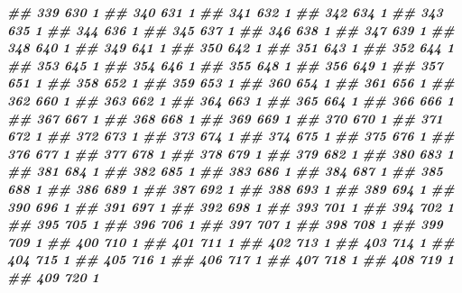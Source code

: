 \documentclass[
]{book}
\newenvironment{Shaded}{\begin{snugshade}}{\end{snugshade}}
\newcommand{\DocumentationTok}[1]{\textcolor[rgb]{0.56,0.35,0.01}{\textbf{\textit{#1}}}}
\theoremstyle{definition}
\theoremstyle{definition}
\theoremstyle{definition}
\theoremstyle{definition}
\theoremstyle{remark}
\begin{document}
\begin{Shaded}
\begin{Highlighting}[]
\DocumentationTok{\#\# 339    630 1}
\DocumentationTok{\#\# 340    631 1}
\DocumentationTok{\#\# 341    632 1}
\DocumentationTok{\#\# 342    634 1}
\DocumentationTok{\#\# 343    635 1}
\DocumentationTok{\#\# 344    636 1}
\DocumentationTok{\#\# 345    637 1}
\DocumentationTok{\#\# 346    638 1}
\DocumentationTok{\#\# 347    639 1}
\DocumentationTok{\#\# 348    640 1}
\DocumentationTok{\#\# 349    641 1}
\DocumentationTok{\#\# 350    642 1}
\DocumentationTok{\#\# 351    643 1}
\DocumentationTok{\#\# 352    644 1}
\DocumentationTok{\#\# 353    645 1}
\DocumentationTok{\#\# 354    646 1}
\DocumentationTok{\#\# 355    648 1}
\DocumentationTok{\#\# 356    649 1}
\DocumentationTok{\#\# 357    651 1}
\DocumentationTok{\#\# 358    652 1}
\DocumentationTok{\#\# 359    653 1}
\DocumentationTok{\#\# 360    654 1}
\DocumentationTok{\#\# 361    656 1}
\DocumentationTok{\#\# 362    660 1}
\DocumentationTok{\#\# 363    662 1}
\DocumentationTok{\#\# 364    663 1}
\DocumentationTok{\#\# 365    664 1}
\DocumentationTok{\#\# 366    666 1}
\DocumentationTok{\#\# 367    667 1}
\DocumentationTok{\#\# 368    668 1}
\DocumentationTok{\#\# 369    669 1}
\DocumentationTok{\#\# 370    670 1}
\DocumentationTok{\#\# 371    672 1}
\DocumentationTok{\#\# 372    673 1}
\DocumentationTok{\#\# 373    674 1}
\DocumentationTok{\#\# 374    675 1}
\DocumentationTok{\#\# 375    676 1}
\DocumentationTok{\#\# 376    677 1}
\DocumentationTok{\#\# 377    678 1}
\DocumentationTok{\#\# 378    679 1}
\DocumentationTok{\#\# 379    682 1}
\DocumentationTok{\#\# 380    683 1}
\DocumentationTok{\#\# 381    684 1}
\DocumentationTok{\#\# 382    685 1}
\DocumentationTok{\#\# 383    686 1}
\DocumentationTok{\#\# 384    687 1}
\DocumentationTok{\#\# 385    688 1}
\DocumentationTok{\#\# 386    689 1}
\DocumentationTok{\#\# 387    692 1}
\DocumentationTok{\#\# 388    693 1}
\DocumentationTok{\#\# 389    694 1}
\DocumentationTok{\#\# 390    696 1}
\DocumentationTok{\#\# 391    697 1}
\DocumentationTok{\#\# 392    698 1}
\DocumentationTok{\#\# 393    701 1}
\DocumentationTok{\#\# 394    702 1}
\DocumentationTok{\#\# 395    705 1}
\DocumentationTok{\#\# 396    706 1}
\DocumentationTok{\#\# 397    707 1}
\DocumentationTok{\#\# 398    708 1}
\DocumentationTok{\#\# 399    709 1}
\DocumentationTok{\#\# 400    710 1}
\DocumentationTok{\#\# 401    711 1}
\DocumentationTok{\#\# 402    713 1}
\DocumentationTok{\#\# 403    714 1}
\DocumentationTok{\#\# 404    715 1}
\DocumentationTok{\#\# 405    716 1}
\DocumentationTok{\#\# 406    717 1}
\DocumentationTok{\#\# 407    718 1}
\DocumentationTok{\#\# 408    719 1}
\DocumentationTok{\#\# 409    720 1}

\end{Highlighting}
\end{Shaded}
\end{document}
